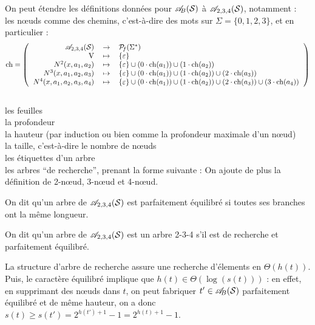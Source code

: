 			\colsep{2.2pt}
			On peut étendre les définitions données pour \(\mathscr{A}_{\!B}(\mathcal{S})\) à \(\mathscr{A}_{2,3,4}(\mathcal{S})\), notamment : \\
				 \bdot les n\oe uds comme des chemins, c'est-à-dire des mots sur \(\Sigma = \{0,1,2,3\}\), et en particulier :
					\[
						\ch = \left( \begin{tabular}[h]{rcl}
							\(\AdtqS\) & \(\to\) & \(\cal{P}_{\!f}(\Sigma^*)\) \\
							\(\V\) & \(\mapsto\) & \(\{\varepsilon\}\) \\
							\(\N^2(x,a_1,a_2)\) & \(\mapsto\) & \(\{\varepsilon\} \cup (0\cdot \ch(a_1)) \cup (1\cdot \ch(a_2))\) \\
							\(\N^3(x,a_1,a_2,a_3)\) & \(\mapsto\) & \(\{\varepsilon\} \cup (0\cdot \ch(a_1)) \cup (1\cdot \ch(a_2)) \cup (2\cdot \ch(a_3))\) \\
							\(N^4(x,a_1,a_2,a_3,a_4)\)& \(\mapsto\) & \(\{\varepsilon\} \cup (0\cdot \ch(a_1)) \cup (1\cdot \ch(a_2)) \cup (2\cdot \ch(a_3)) \cup (3\cdot \ch(a_4))\)
						\end{tabular} \right)
					\]
				\\
				 \bdot les feuilles \\
				 \bdot la profondeur \\
				 \bdot la hauteur (par induction ou bien comme la profondeur maximale d'un n\oe ud) \\
				 \bdot la taille, c'est-à-dire le nombre de n\oe uds \\
				 \bdot les étiquettes d'un arbre \\
				 \bdot les arbres ``de recherche'', prenant la forme suivante : \nt
			On ajoute de plus la définition de 2-n\oe ud, 3-n\oe ud et 4-n\oe ud.
			
			\begin{Definition}
				On dit qu'un arbre de \(\mathscr{A}_{2,3,4}(\mathcal{S})\) est parfaitement équilibré si toutes ses branches ont la même longueur.
			\end{Definition}
		
			\begin{Definition}[arbre 2-3-4]
				On dit qu'un arbre de \(\mathscr{A}_{2,3,4}(\mathcal{S})\) est un arbre 2-3-4 s'il est de recherche et parfaitement équilibré.
			\end{Definition}
			
			\begin{Remarque}
				La structure d'arbre de recherche assure une recherche d'élements en \(\Theta(h(t))\). Puis, le caractère équilibré implique que \(h(t) \in \Theta(\log(s(t)))\) : en effet, en supprimant des n\oe uds dans \(t\), on peut fabriquer \(t'\in\mathscr{A}_{\!B}(\mathcal{S})\) parfaitement équilibré et de même hauteur, on a donc \(s(t) \geq s(t') = 2^{h(t')+1}-1 = 2^{h(t)+1}-1\).
			\end{Remarque}
		
